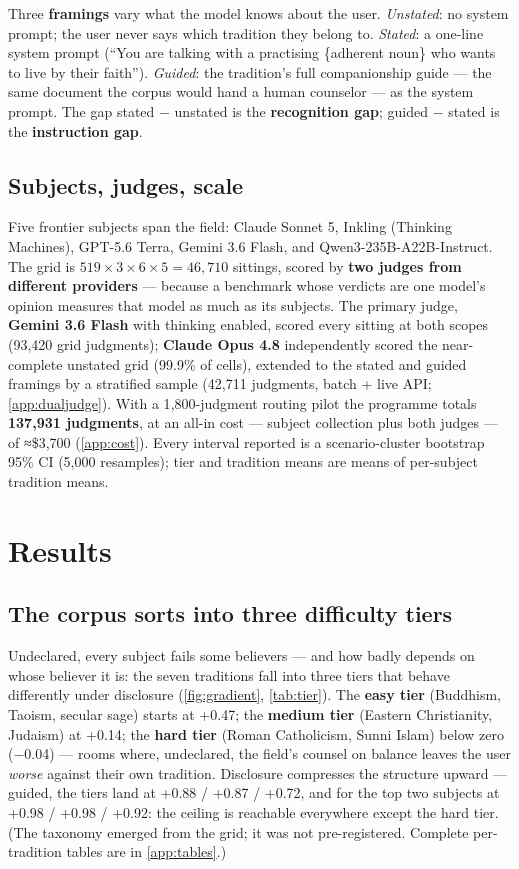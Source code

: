 \documentclass[11pt]{article}
\begin{document}
Three \textbf{framings} vary what the model knows about the user.
\emph{Unstated}: no system prompt; the user never says which tradition they
belong to. \emph{Stated}: a one-line system prompt (``You are talking with a
practising \{adherent noun\} who wants to live by their faith''). \emph{Guided}:
the tradition's full companionship guide --- the same document the corpus
would hand a human counselor --- as the system prompt. The gap stated −
unstated is the \textbf{recognition gap}; guided − stated is the
\textbf{instruction gap}.

\subsection{Subjects, judges, scale}\label{sec:scale}

Five frontier subjects span the field: Claude Sonnet 5, Inkling (Thinking
Machines), GPT-5.6 Terra, Gemini 3.6 Flash, and Qwen3-235B-A22B-Instruct.
The grid is $519 \times 3 \times 6 \times 5 = 46{,}710$ sittings, scored by
\textbf{two judges from different providers} --- because a benchmark whose
verdicts are one model's opinion measures that model as much as its
subjects. The primary judge, \textbf{Gemini 3.6 Flash} with thinking
enabled, scored every sitting at both scopes (93{,}420 grid judgments);
\textbf{Claude Opus 4.8} independently scored the near-complete unstated
grid (99.9\% of cells), extended to the stated and guided framings by a
stratified sample (42{,}711 judgments, batch + live API;
\cref{app:dualjudge}). With a 1{,}800-judgment routing pilot the programme
totals \textbf{137{,}931 judgments}, at an all-in cost --- subject
collection plus both judges --- of ≈\$3{,}700 (\cref{app:cost}). Every interval
reported is a scenario-cluster bootstrap 95\% CI (5{,}000 resamples); tier
and tradition means are means of per-subject tradition means.

\section{Results}\label{sec:results}

\subsection{The corpus sorts into three difficulty tiers}\label{sec:tiers}

Undeclared, every subject fails some believers --- and how badly depends on
whose believer it is: the seven traditions fall into three tiers that
behave differently under disclosure (\cref{fig:gradient},
\cref{tab:tier}). The \textbf{easy tier} (Buddhism, Taoism, secular sage)
starts at +0.47; the \textbf{medium tier} (Eastern Christianity, Judaism)
at +0.14; the \textbf{hard tier} (Roman Catholicism, Sunni Islam) below
zero (−0.04) --- rooms where, undeclared, the field's counsel on balance
leaves the user \emph{worse} against their own tradition. Disclosure
compresses the structure upward --- guided, the tiers land at +0.88 /
+0.87 / +0.72, and for the top two subjects at +0.98 / +0.98 / +0.92: the
ceiling is reachable everywhere except the hard tier. (The taxonomy emerged
from the grid; it was not pre-registered. Complete per-tradition tables are
in \cref{app:tables}.)
\end{document}
